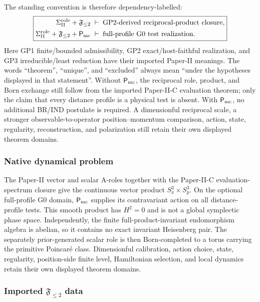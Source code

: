 \documentclass[12pt,a4paper]{article}
\begin{document}
The standing convention is therefore dependency-labelled:
\[
\boxed{
\begin{aligned}
  \Sigma_{\rm II}^{\rm role}+\mathfrak F_{\le2}
  &\;\vdash\;\text{GP2-derived reciprocal-product closure},\\
  \Sigma_{\rm II}^{\rm role}+\mathfrak F_{\le2}+\mathsf P_{\rm mc}
  &\;\vdash\;\text{full-profile G0 test realization}.
\end{aligned}
}
\]
Here GP1 finite/bounded admissibility, GP2 exact/host-faithful realization,
and GP3 irreducible/least reduction have their imported Paper-II meanings.
The words ``theorem'', ``unique'', and ``excluded'' always mean ``under the
hypotheses displayed in that statement''.  Without \(\mathsf P_{\rm mc}\),
the reciprocal role, product, and Born exchange still follow from the imported
Paper-II-C evaluation theorem; only the claim that every distance profile is a
physical test is absent.  With \(\mathsf P_{\rm mc}\), no additional BR/IND
postulate is required.  A
dimensionful reciprocal scale, a stronger observable-to-operator
position--momentum comparison, action, state, regularity, reconstruction, and
polarization still retain their own displayed theorem domains.

\subsubsection{Native dynamical problem}
\label{p3:subsec:native-dynamical-problem}

The Paper-II vector and scalar A-roles together with the Paper-II-C
evaluation-spectrum closure give the continuous vector product
$S^3_x\times S^3_p$.  On the optional full-profile G0 domain,
$\mathsf P_{\rm mc}$ supplies its contravariant action on all distance-profile
tests.  This smooth product
has $H^2=0$ and is not a global symplectic phase space.  Independently, the
finite full-product-invariant endomorphism algebra is abelian, so it contains
no exact invariant Heisenberg pair.  The separately prior-generated scalar
role is then Born-completed to a torus carrying the primitive Poincar\'e class.
Dimensionful calibration, action choice, state, regularity, position-side
finite level, Hamiltonian selection, and local dynamics retain their own
displayed theorem domains.

\subsubsection{Imported \texorpdfstring{$\mathfrak F_{\le2}$}{F<=2} data}
\label{p3:subsec:axioms}
\end{document}
